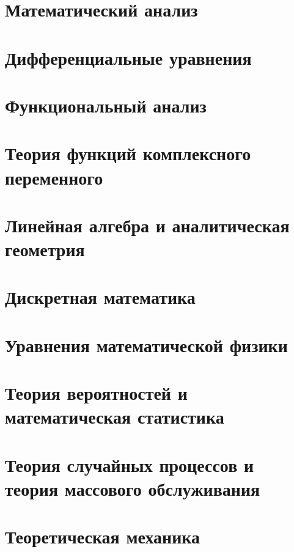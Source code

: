 \documentclass[12pt,a4paper]{article}
\begin{document}
\section{Математический анализ}


\section{Дифференциальные уравнения}


\section{Функциональный анализ}


\section{Теория функций комплексного переменного}


\section{Линейная алгебра и аналитическая геометрия}


\section{Дискретная математика}


\section{Уравнения математической физики}


\section{Теория вероятностей и математическая статистика}


\section{Теория случайных процессов и теория массового обслуживания}


\section{Теоретическая механика}

\end{document}
